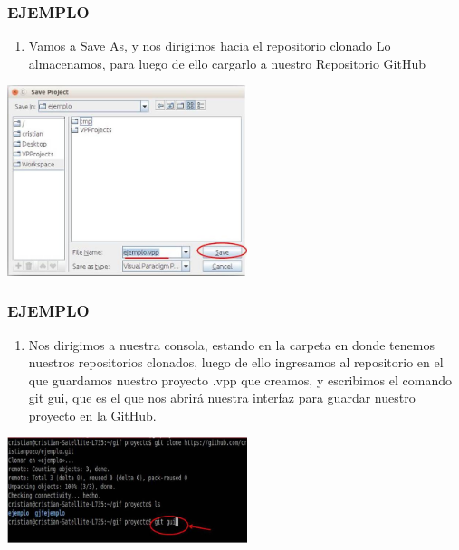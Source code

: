 \documentclass[8pt]{beamer}
\begin{document}
\begin{frame}
\frametitle{EJEMPLO}
\begin{enumerate}[9. ]
	\justifying
    \item Vamos a Save As, y nos dirigimos hacia el repositorio clonado Lo almacenamos, para luego de ello cargarlo a nuestro Repositorio GitHub\\
\end{enumerate}
\begin{center}
\includegraphics[width=7cm]{img/b13}\\
\fontsize{6}{1}
\end{center}
\end{frame}

\begin{frame}
\frametitle{EJEMPLO}
\begin{enumerate}[10. ]
	\justifying
    \item Nos dirigimos a nuestra consola, estando en la carpeta en donde tenemos nuestros repositorios clonados, luego de ello ingresamos al repositorio en el que guardamos nuestro proyecto .vpp que creamos, y escribimos el comando git gui, que es el que nos abrirá nuestra interfaz para guardar nuestro proyecto en la GitHub.\\
\end{enumerate}
\begin{center}
\includegraphics[width=7cm]{img/b14}\\
\fontsize{6}{1}
\end{center}
\end{frame}
\end{document}
